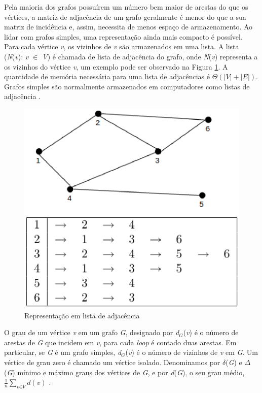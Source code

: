 Pela maioria dos grafos possuírem um número bem maior de arestas do que os vértices, a matriz de adjacência de um grafo geralmente é menor do que a sua matriz de incidência e, assim, necessita de menos espaço de armazenamento. Ao lidar com grafos simples, uma representação ainda mais compacto é possível. Para cada vértice \textit{v}, os vizinhos de \textit{v} são armazenados em uma lista. A lista (\textit{N}(\textit{v}): \textit{v $\in$ V}) é chamada de lista de adjacência do grafo, onde \textit{N}(\textit{v}) representa a os vizinhos do vértice \textit{v}, um exemplo pode ser observado na Figura \ref{lista_adjacencia}. A quantidade de memória necessária para uma lista de adjacências é $\Theta(|\textit{V}| + |\textit{E}|)$. Grafos simples são normalmente armazenados em computadores como listas de adjacência \cite{Costa:2011}.

\begin{figure}[!h]
	\centering
	\includegraphics[scale=0.5]{figuras/capitulo1/lista_adjacencia.eps}
	\caption{Representação em lista de adjacência}
	\label{lista_adjacencia}
\end{figure}

O grau de um vértice \textit{v} em um grafo \textit{G}, designado por \textit{d$_G$}(\textit{v}) é o número de arestas de \textit{G} que incidem em \textit{v}, para cada \textit{loop} é contado duas arestas. Em particular, se \textit{G} é um grafo simples, \textit{d$_G$}(\textit{v}) é o número de vizinhos de \textit{v} em \textit{G}. Um vértice de grau zero é chamado um vértice isolado. Denominamos por $\delta$(\textit{G}) e $\Delta$(\textit{G}) mínimo e máximo graus dos vértices de \textit{G}, e por \textit{d}(\textit{G}), o seu grau médio, $\frac{1}{n}\sum_{\textit{v}\in\textit{V}} \textit{d}(\textit{v})$ \cite{Diestel:1997}.

